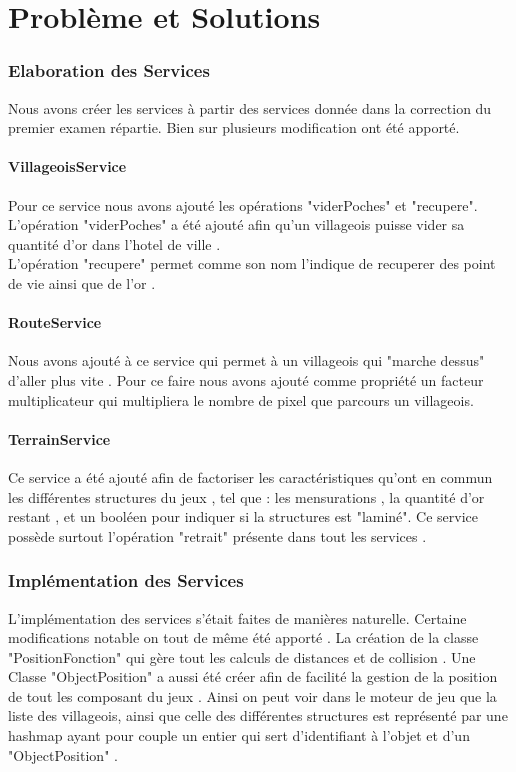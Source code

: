 \part{Problème et Solutions}

\section{Elaboration des Services}
Nous avons créer les services à partir des services donnée dans la correction du premier examen répartie. Bien sur plusieurs modification ont été apporté.
	\subsection{VillageoisService}
	Pour ce service nous avons ajouté les opérations "viderPoches" et "recupere".
	L'opération "viderPoches" a été ajouté afin qu'un villageois puisse vider sa quantité d'or dans l'hotel de ville .\\
	L'opération "recupere" permet comme son nom l'indique de recuperer des point de vie ainsi que de l'or .
	\subsection{RouteService}
	Nous avons ajouté à ce service qui permet à un villageois qui "marche dessus" d'aller plus vite . Pour ce faire nous avons ajouté comme propriété un facteur multiplicateur qui multipliera le nombre de pixel que parcours un villageois. 	
	
	\subsection{TerrainService}
	Ce service a été ajouté afin de factoriser les caractéristiques qu'ont en commun les différentes structures du jeux , tel que : les mensurations , la quantité d'or restant , et un booléen pour indiquer si la structures est "laminé". Ce service possède surtout l'opération "retrait" présente dans tout les services .
	
\section{Implémentation des Services}
L’implémentation des services s’était faites de manières naturelle. Certaine modifications notable on tout de même été apporté . La création de la classe "PositionFonction" qui gère tout les calculs de distances et de collision . Une Classe "ObjectPosition"  a aussi été créer afin de facilité la gestion de la position de tout les composant du jeux . Ainsi on peut voir dans le moteur de jeu que la liste des villageois, ainsi que celle des différentes structures est représenté par une hashmap ayant pour couple un entier qui sert d'identifiant à l'objet et d'un "ObjectPosition" .

